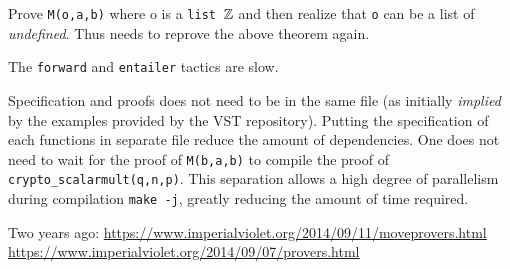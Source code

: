 Prove \texttt{M(o,a,b)} where o is a \texttt{list $\mathbb{Z}$} and then realize that
\texttt{o} can be a list of \textit{undefined}. Thus needs to reprove the above
theorem again.

The \texttt{forward} and \texttt{entailer} tactics are slow.

Specification and proofs does not need to be in the same file (as initially \textit{implied}
by the examples provided by the VST repository). Putting the specification of each
functions in separate file reduce the amount of dependencies. One does not need
to wait for the proof of \texttt{M(b,a,b)} to compile the proof of \texttt{crypto\_scalarmult(q,n,p)}.
This separation allows a high degree of parallelism during compilation \texttt{make -j},
greatly reducing the amount of time required.


Two years ago:
\url{https://www.imperialviolet.org/2014/09/11/moveprovers.html}
\url{https://www.imperialviolet.org/2014/09/07/provers.html}
